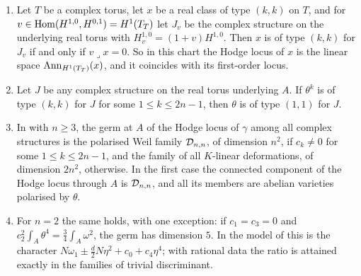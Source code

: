 \begin{proposition}
\label{prop:p2primelocus}
\begin{enumerate}[label=\textup{(\roman*)},leftmargin=2.6em,itemsep=2pt]
\item Let $T$ be a complex torus, let $x$ be a real class of type $(k,k)$ on
  $T$, and for $v\in\operatorname{Hom}(H^{1,0},H^{0,1})=H^{1}(T_{T})$ let $J_{v}$ be the
  complex structure on the underlying real torus with $H^{1,0}_{v}=(1+v)H^{1,0}$.
  Then $x$ is of type $(k,k)$ for $J_{v}$ if and only if $v\lrcorner x=0$. So
  in this chart the Hodge locus of $x$ is the linear space
  $\operatorname{Ann}_{H^{1}(T_{T})}(x)$, and it coincides with its first-order locus.
\item Let $J$ be any complex structure on the real torus underlying $A$. If
  $\theta^{k}$ is of type $(k,k)$ for $J$ for some $1\le k\le2n-1$, then
  $\theta$ is of type $(1,1)$ for $J$.
\item In  with $n\ge3$, the germ at $A$ of the Hodge locus
  of $\gamma$ among all complex structures is the polarised Weil family
  $\mathcal{D}_{n,n}$, of dimension $n^{2}$, if $c_{k}\ne0$ for some $1\le k\le2n-1$,
  and the family of all $K$-linear deformations, of dimension $2n^{2}$,
  otherwise. In the first case the connected component of the Hodge locus
  through $A$ is $\mathcal{D}_{n,n}$, and all its members are abelian varieties
  polarised by $\theta$.
\item For $n=2$ the same holds, with one exception: if $c_{1}=c_{3}=0$ and
  $c_{2}^{2}\int_{A}\theta^{4}=\tfrac34\int_{A}\omega^{2}$, the germ has
  dimension $5$. In the model of  this is
  the character $N\omega_{1}\pm\tfrac{d}{2}N\eta^{2}+c_{0}+c_{4}\eta^{4}$;
  with rational data the ratio is attained exactly in the families of trivial
  discriminant.
\end{enumerate}
\end{proposition}

